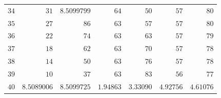 \begin{center}
\begin{tabular}{||r||r|r|r|r|r|r||}
\(34\) & \(31\) & \(8.5099799\) & \(64\) & \(50\) & \(57\) & \(80\)\\
\(35\) & \(27\) & \(86\) & \(63\) & \(57\) & \(57\) & \(80\)\\
\(36\) & \(22\) & \(74\) & \(63\) & \(63\) & \(57\) & \(79\)\\
\(37\) & \(18\) & \(62\) & \(63\) & \(70\) & \(57\) & \(78\)\\
\(38\) & \(14\) & \(50\) & \(63\) & \(76\) & \(57\) & \(78\)\\
\(39\) & \(10\) & \(37\) & \(63\) & \(83\) & \(56\) & \(77\)\\[3pt]
\(40\) & \(8.5089006\) & \(8.5099725\) & \(1.94863\) & \(3.33090\) & \(4.92756\) & \(4.61076\)\\
\hline\hline
\end{tabular}
\end{center}
\endgroup
\clearpage
